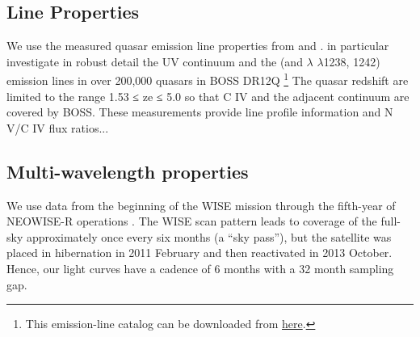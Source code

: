 \documentclass[a4paper,fleqn,usenatbib]{mnras}
\begin{document}
\subsection{Line Properties}  
We use the measured quasar emission line properties from \citet{Shen2011} and \citet{Hamann2017}. \citet{Hamann2017} in particular investigate in robust detail the UV continuum and the \civ (and \nv $\lambda$ $\lambda$1238, 1242) emission lines in over 200,000 quasars in BOSS DR12Q \citep{Paris2017}\footnote{This emission-line catalog can be downloaded from \href{https://datadryad.org/stash/dataset/doi:10.6086/D1H59V}{here}.} The quasar redshift are limited to the range 1.53 ≤ ze ≤ 5.0 so that C IV and the adjacent continuum are covered by BOSS. These measurements provide line profile information and N V/C IV flux ratios... 
%

\subsection{Multi-wavelength properties}
We use data from the beginning of the WISE mission \citep[2010
January; ][]{Wright2010} through the fifth-year of NEOWISE-R
operations \citep[2018 December; ][]{Mainzer2011}. The WISE scan
pattern leads to coverage of the full-sky approximately once every six
months (a ``sky pass''), but the satellite was placed in hibernation
in 2011 February and then reactivated in 2013 October. Hence, our
light curves have a cadence of 6 months with a 32 month sampling gap.



\begin{figure*}
  \centering
  \includegraphics[width=16.7cm, trim=0.0cm 0.1cm 0.2cm 0.1cm, clip]
  {../plots/perObject/J1205+3422_landscape_20190920.png}
  \includegraphics[width=16.7cm, trim=0.0cm 0.1cm 0.2cm 0.1cm, clip]
  {../plots/perObject/J1638+2827_landscape_20190920.png}
  \includegraphics[width=16.7cm, trim=0.0cm 0.1cm 0.2cm 0.1cm, clip]
  {../plots/perObject/J2228+2201_landscape_20190920.png}
  \vspace{-12pt}
  \caption[]{The threes high-$z$ CLQ quasars; 
    SDSS J1205+3422 (top), 
    SDSS J1638+2827 (middle), 
    SDSS J2228+2201 (bottom). 
  }
  \label{fig:civ_clqs}
\end{figure*}
\end{document}
